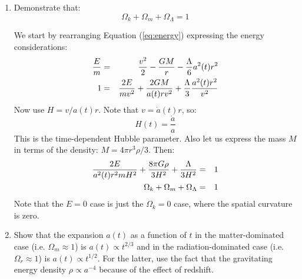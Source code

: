 \begin{enumerate}
\item Demonstrate that:
\begin{equation}
\Omega_k + \Omega_m + \Omega_\Lambda = 1
\end{equation}
\begin{answer}
We start by rearranging Equation (\ref{eq:energy}) expressing the
energy considerations:
\begin{eqnarray}
\frac{E}{m} &=& \frac{v^2}{2}-\frac{GM}{r} - \frac{\Lambda}{6}a^2(t)r^2 \cr
1 &=& \frac{2E}{mv^2} + \frac{2GM}{a(t) rv^2} +
\frac{\Lambda}{3}\frac{a^2(t) r^2}{v^2} 
\end{eqnarray}
Now use $H=v/a(t)r$. Note that $v={\dot a}(t) r$, so:
\begin{equation}
H(t) = \frac{\dot a}{a}
\end{equation}
This is the time-dependent Hubble parameter. Also let us express the
mass $M$ in terms of the density: $M=4\pi r^3\rho/3$. Then:
\begin{eqnarray}
\frac{2E}{a^2(t) r^2 m H^2} + \frac{8\pi
  G\rho}{3H^2}+\frac{\Lambda}{3H^2} &=& 1 \cr 
\Omega_k + \Omega_m + \Omega_\Lambda &=& 1
\end{eqnarray}
Note that the $E=0$ case is just the $\Omega_k=0$ case, where the
spatial curvature is zero.
\end{answer}
\item Show that the expansion $a(t)$ as a function of $t$ in the
matter-dominated case (i.e. $\Omega_m \approx 1$) is $a(t)\propto t^{2/3}$ and in the radiation-dominated
case (i.e. $\Omega_r \approx 1$) is $a(t)\propto t^{1/2}$.
For the latter, use the fact that the gravitating energy density
$\rho \propto a^{-4}$ because of the effect of redshift.


\end{enumerate}
